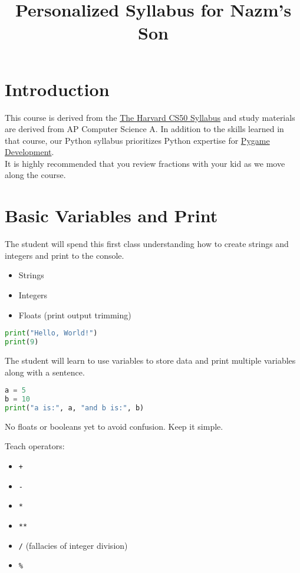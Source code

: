 \documentclass{article}
\title{\vspace{-3em}Personalized Syllabus for Nazm's Son\vspace{-3em}}
\begin{document}
\fontsize{14}{16}\selectfont
\maketitle

\section{Introduction}
This course is derived from the \href{https://cs50.harvard.edu/python/2022/syllabus/}{\underline{The Harvard CS50 Syllabus}} and study materials are derived from AP Computer Science A. In addition to the skills learned in that course, our Python syllabus prioritizes Python expertise for \href{https://www.pygame.org/wiki/about}{Pygame Development}. \\

It is highly recommended that you review fractions with your kid as we move along the course.

\section{Basic Variables and Print}
The student will spend this first class understanding how to create strings and integers and print to the console. \\

\begin{itemize}
    \item Strings
    \item Integers
    \item Floats (print output trimming)
\end{itemize}

\begin{lstlisting}[language=Python]
print("Hello, World!")
print(9)
\end{lstlisting}

The student will learn to use variables to store data and print multiple variables along with a sentence.

\begin{lstlisting}[language=Python]
a = 5
b = 10
print("a is:", a, "and b is:", b)
\end{lstlisting}

No floats or booleans yet to avoid confusion. Keep it simple.

Teach operators:
\begin{itemize}
    \item \verb|+|
    \item \verb|-|
    \item \verb|*|
    \item \verb|**|
    \item \verb|/| (fallacies of integer division)
    \item \verb|%|
\end{itemize}
\end{document}
